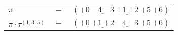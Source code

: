 \begin{example}\label{example:HFLGUNSS}
  \hfill \break
  \begin{tabular}{lll}
    $\pi$ & $=$ & $({+0}~\underline{{-4}~{-3}}~\underline{{+1}~{+2}}~{+5}~{+6})$ \\
    $\pi \cdot \tau^{(1,3,5)}$ & $=$ & $({+0}~\underline{{+1}~{+2}}~\underline{{-4}~{-3}}~{+5}~{+6})$ \\
  \end{tabular}
\end{example}